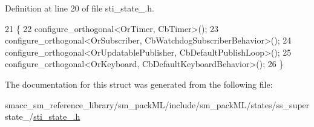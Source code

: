 Definition at line 20 of file sti\+\_\+state\+\_.\+h.


\begin{DoxyCode}
21   \{
22     configure\_orthogonal<OrTimer, CbTimer>();
23     configure\_orthogonal<OrSubscriber, CbWatchdogSubscriberBehavior>();
24     configure\_orthogonal<OrUpdatablePublisher, CbDefaultPublishLoop>();
25     configure\_orthogonal<OrKeyboard, CbDefaultKeyboardBehavior>();
26   \}
\end{DoxyCode}


The documentation for this struct was generated from the following file\+:\begin{DoxyCompactItemize}
\item 
smacc\+\_\+sm\+\_\+reference\+\_\+library/sm\+\_\+pack\+M\+L/include/sm\+\_\+pack\+M\+L/states/ss\+\_\+superstate\+\_/\hyperlink{sm__packML_2include_2sm__packML_2states_2ss__superstate__1_2sti__state__2_8h}{sti\+\_\+state\+\_.\+h}\end{DoxyCompactItemize}
